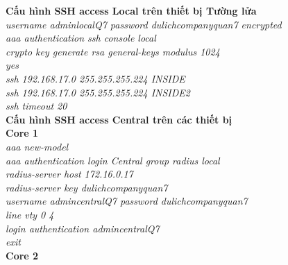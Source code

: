\documentclass[a4paper, 12pt]{article}
\begin{document}
\hspace*{1cm} \textbf{Cấu hình SSH access Local trên thiết bị Tường lửa}\\
\hspace*{2cm}\textit{username adminlocalQ7 password dulichcompanyquan7 encrypted\\
\hspace*{2cm}aaa authentication ssh console local \\
\hspace*{2cm}crypto key generate rsa general-keys modulus 1024\\
\hspace*{2cm}yes\\
\hspace*{2cm}ssh 192.168.17.0 255.255.255.224 INSIDE\\
\hspace*{2cm}ssh 192.168.17.0 255.255.255.224 INSIDE2\\
\hspace*{2cm}ssh timeout 20\\}
\hspace*{1cm} \textbf{ Cấu hình SSH access Central trên các thiết bị}\\
\hspace*{1cm} \textbf{Core 1}\\
\hspace*{2cm}\textit{aaa new-model\\
\hspace*{2cm}aaa authentication login Central group radius local\\
\hspace*{2cm}radius-server host 172.16.0.17\\
\hspace*{2cm}radius-server key dulichcompanyquan7\\
\hspace*{2cm}username admincentralQ7 password dulichcompanyquan7\\
\hspace*{2cm}line vty 0 4\\
\hspace*{2cm}login authentication admincentralQ7\\
\hspace*{2cm}exit}\\
\hspace*{1cm} \textbf{Core 2}\\
\end{document}
